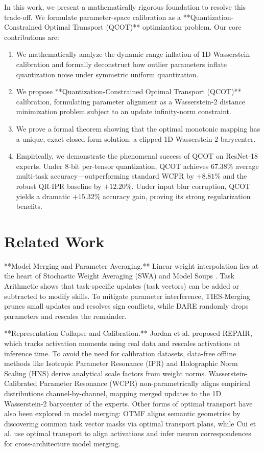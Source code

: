 \documentclass{article}
\theoremstyle{plain}
\theoremstyle{definition}
\theoremstyle{remark}
\begin{document}
In this work, we present a mathematically rigorous foundation to resolve this trade-off. We formulate parameter-space calibration as a **Quantization-Constrained Optimal Transport (QCOT)** optimization problem. Our core contributions are:
\begin{enumerate}
    \item We mathematically analyze the dynamic range inflation of 1D Wasserstein calibration and formally deconstruct how outlier parameters inflate quantization noise under symmetric uniform quantization.
    \item We propose **Quantization-Constrained Optimal Transport (QCOT)** calibration, formulating parameter alignment as a Wasserstein-2 distance minimization problem subject to an update infinity-norm constraint.
    \item We prove a formal theorem showing that the optimal monotonic mapping has a unique, exact closed-form solution: a clipped 1D Wasserstein-2 barycenter.
    \item Empirically, we demonstrate the phenomenal success of QCOT on ResNet-18 experts. Under 8-bit per-tensor quantization, QCOT achieves $67.38\%$ average multi-task accuracy—outperforming standard WCPR by $+8.81\%$ and the robust QR-IPR baseline by $+12.20\%$. Under input blur corruption, QCOT yields a dramatic $+15.32\%$ accuracy gain, proving its strong regularization benefits.
\end{enumerate}

\section{Related Work}
\label{sec:related}
**Model Merging and Parameter Averaging.** Linear weight interpolation lies at the heart of Stochastic Weight Averaging (SWA) and Model Soups \cite{Wortsman2022Soups}. Task Arithmetic \cite{Ilharco2023Arithmetic} shows that task-specific updates (task vectors) can be added or subtracted to modify skills. To mitigate parameter interference, TIES-Merging \cite{Yadav2023Ties} prunes small updates and resolves sign conflicts, while DARE \cite{Jin2023Dare} randomly drops parameters and rescales the remainder. 

**Representation Collapse and Calibration.** Jordan et al. \cite{Jordan2023Repair} proposed REPAIR, which tracks activation moments using real data and rescales activations at inference time. To avoid the need for calibration datasets, data-free offline methods like Isotropic Parameter Resonance (IPR) \cite{Leclaire2024IPR} and Holographic Norm Scaling (HNS) \cite{Visionary2026HNS} derive analytical scale factors from weight norms. Wasserstein-Calibrated Parameter Resonance (WCPR) non-parametrically aligns empirical distributions channel-by-channel, mapping merged updates to the 1D Wasserstein-2 barycenter of the experts. Other forms of optimal transport have also been explored in model merging: OTMF \cite{Pan2025Merging} aligns semantic geometries by discovering common task vector masks via optimal transport plans, while Cui et al. \cite{Cui2026Transport} use optimal transport to align activations and infer neuron correspondences for cross-architecture model merging.
\end{document}
